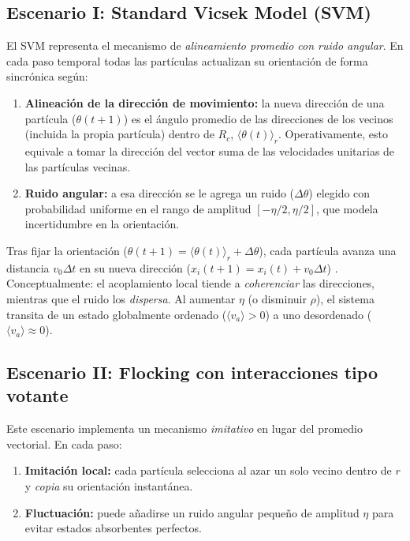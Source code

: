 \documentclass{article}
\begin{document}
\subsection{Escenario I: Standard Vicsek Model (SVM) \cite{vicsek1995}}
El SVM representa el mecanismo de \emph{alineamiento promedio con ruido angular}. En cada paso temporal todas las partículas actualizan su orientación de forma sincrónica según:
\begin{enumerate}
  \item \textbf{Alineación de la dirección de movimiento:} la nueva dirección de una partícula (\(\theta(t+1)\)) es el ángulo promedio de las direcciones de los vecinos (incluida la propia partícula) dentro de \(R_c\), \(\langle\theta(t)\rangle_r\). Operativamente, esto equivale a tomar la dirección del vector suma de las velocidades unitarias de las partículas vecinas.
  \item \textbf{Ruido angular:} a esa dirección se le agrega un ruido (\(\Delta \theta\)) elegido con probabilidad uniforme en el rango de amplitud \([-\eta/2, \eta/2]\), que modela incertidumbre en la orientación.
\end{enumerate}
Tras fijar la orientación (\(\theta(t+1)= \langle\theta(t)\rangle_r + \Delta \theta\)), cada partícula avanza una distancia \(v_0\Delta t\) en su nueva dirección (\(x_i(t+1) = x_i(t) + v_0\Delta t\)) . Conceptualmente: el acoplamiento local tiende a \emph{coherenciar} las direcciones, mientras que el ruido los \emph{dispersa}. Al aumentar \(\eta\) (o disminuir \(\rho\)), el sistema transita de un estado globalmente ordenado (\(\langle v_a\rangle>0\)) a uno desordenado (\(\langle v_a\rangle\approx 0\)).

\subsection{Escenario II: Flocking con interacciones tipo votante \cite{baglietto2018}}
Este escenario implementa un mecanismo \emph{imitativo} en lugar del promedio vectorial. En cada paso:
\begin{enumerate}
  \item \textbf{Imitación local:} cada partícula selecciona al azar un solo vecino dentro de \(r\) y \emph{copia} su orientación instantánea.
  \item \textbf{Fluctuación:} puede añadirse un ruido angular pequeño de amplitud \(\eta\) para evitar estados absorbentes perfectos.
\end{enumerate}
\end{document}
